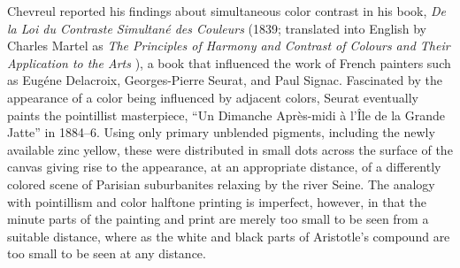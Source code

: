 Chevreul reported his findings about simultaneous color contrast in his book, \emph{De la Loi du Contraste Simultan\'{e} des Couleurs} (1839; translated into English by Charles Martel as \emph{The Principles of Harmony and Contrast of Colours and Their Application to the Arts} \citeyear{Chevreul:1855kx}), a book that influenced the work of French painters such as Eug\'{e}ne Delacroix, Georges-Pierre Seurat, and Paul Signac. Fascinated by the appearance of a color being influenced by adjacent colors, Seurat eventually paints the pointillist masterpiece, “Un Dimanche Apr\`{e}s-midi \`{a} l'\^{I}le de la Grande Jatte” in 1884--6. Using only primary unblended pigments, including the newly available zinc yellow, these were distributed in small dots across the surface of the canvas giving rise to the appearance, at an appropriate distance, of a differently colored scene of Parisian suburbanites relaxing by the river Seine. The analogy with pointillism and color halftone printing is imperfect, however, in that the minute parts of the painting and print are merely too small to be seen from a suitable distance, where as the white and black parts of Aristotle's compound are too small to be seen at any distance.



